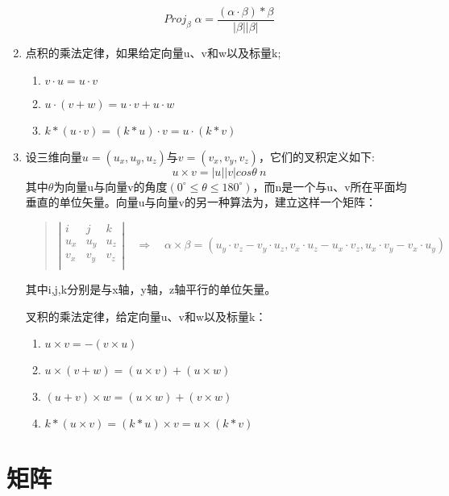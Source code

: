 \documentclass[a4paper,10pt]{article}
\begin{document}
\begin{CJK}{UTF8}{song}
\begin{enumerate}
\begin{displaymath}
Proj_{\beta}\;\alpha=\frac{(\alpha\cdot\beta)*\beta}{|\beta||\beta|}
\end{displaymath}
\item 点积的乘法定律，如果给定向量u、v和w以及标量k;
\begin{enumerate}
\item $v\cdot u=u\cdot v $
\item $u \cdot (v+w)=u \cdot v + u \cdot w $
\item $k*(u\cdot v)=(k*u)\cdot v=u\cdot(k*v) $
\end{enumerate}
\item 设三维向量$u=(u_{x},u_{y},u_{z})$与$v=(v_{x},v_{y},v_{z})$，它们的叉积定义如下:
\begin{displaymath}
u\times v=|u||v|cos\theta\: n
\end{displaymath}
其中$\theta$为向量u与向量v的角度$(0^\circ\leq\theta\leq 180^\circ)$，而n是一个与u、v所在平面均垂直的单位矢量。向量u与向量v的另一种算法为，建立这样一个矩阵： 
\begin{quote}
\begin{math}
\left| \begin{array}{ccc}
	i & j & k \\
	u_{x} & u_{y} & u_{z} \\
	v_{x} & v_{y} & v_{z} \\
       \end{array}
\right|  
\quad\Rightarrow\quad
\alpha \times \beta =(u_{y}\cdot v_{z}-v_{y}\cdot u_{z} 
                     , v_{x}\cdot u_{z}-u_{x}\cdot v_{z} 
                     , u_{x}\cdot v_{y}-v_{x}\cdot u_{y})
\end{math}
\end{quote}
其中i,j,k分别是与x轴，y轴，z轴平行的单位矢量。

叉积的乘法定律，给定向量u、v和w以及标量k：
\begin{enumerate}
\item $u\times v= -(v \times u ) $
\item $u \times ( v +w)=(u\times v) + (u\times w) $
\item $(u+v)\times w =(u \times w) + (v \times w) $
\item $k*(u \times v) = (k*u)\times v =u \times(k*v)$
\end{enumerate}
\end{enumerate}
\section{矩阵}

\end{CJK}
\end{document}
